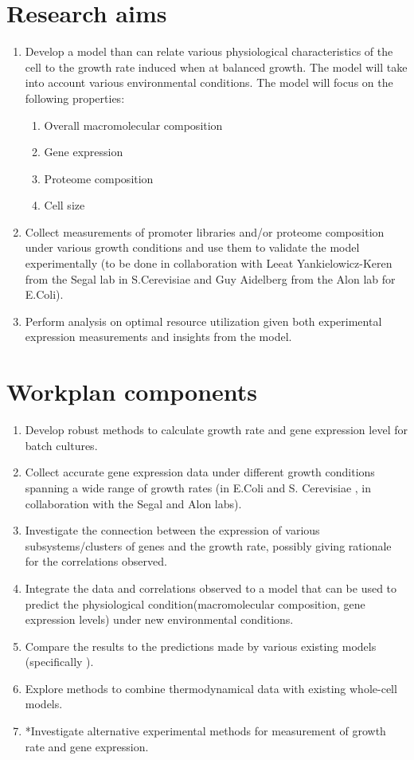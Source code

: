 \documentclass{report}
\begin{document}
\section{Research aims}
\begin{enumerate}
\item Develop a model than can relate various physiological characteristics of the cell to the growth rate induced when at balanced growth.
The model will take into account various environmental conditions.
The model will focus on the following properties:
\begin{enumerate}
\item Overall macromolecular composition
\item Gene expression
\item Proteome composition
\item Cell size
\end{enumerate}
\item Collect measurements of promoter libraries and/or proteome composition under various growth conditions and use them to validate the model experimentally (to be done in collaboration with Leeat Yankielowicz-Keren from the Segal lab in S.Cerevisiae and Guy Aidelberg from the Alon lab for E.Coli).
\item Perform analysis on optimal resource utilization given both experimental expression measurements and insights from the model.
\end{enumerate}
\section{Workplan components}
\begin{enumerate}
\item Develop robust methods to calculate growth rate and gene expression level for batch cultures.
\item Collect accurate gene expression data under different growth conditions spanning a wide range of growth rates (in E.Coli and S. Cerevisiae , in collaboration with the Segal and Alon labs).
\item Investigate the connection between the expression of various subsystems/clusters of genes and the growth rate, possibly giving rationale for the correlations observed.
\item Integrate the data and correlations observed to a model that can be used to predict the physiological condition(macromolecular composition, gene expression levels) under new environmental conditions.
\item Compare the results to the predictions made by various existing models (specifically \cite{Lerman2012,Karr2012}).
\item Explore methods to combine thermodynamical data with existing whole-cell models.
\item *Investigate alternative experimental methods for measurement of growth rate and gene expression.
\end{enumerate}
\end{document}
